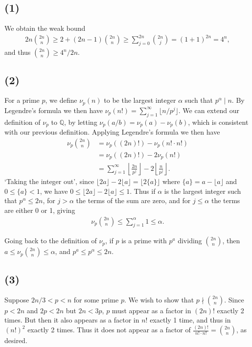 \documentclass[11pt, a4paper, reqno]{amsart}
\theoremstyle{definition}
\begin{document}
\subsection*{(1)}
We obtain the weak bound
\begin{align*}
	2n\binom{2n}{n} \geq 2 + (2n - 1)\binom{2n}{n} \geq \sum_{j = 0}^{2n}\binom{2n}{j} = (1 + 1)^{2n} = 4^{n},
\end{align*}
and thus $\binom{2n}{n} \geq 4^n/2n$.

\subsection*{(2)} For a prime $p$, we define $\nu_p(n)$ to be the largest integer $\alpha$ such that $p^\alpha \mid n$. By Legendre's formula we then have $\nu_p(n!) = \sum_{j = 1}^{\infty}\lfloor n/p^j \rfloor$.
We can extend our definition of $\nu_p$ to $\mathbb{Q}$, by letting $\nu_p(a/b) = \nu_p(a) - \nu_p(b)$, which is consistent with our previous definition. Applying Legendre's formula we then have
\begin{align*}
	\nu_p \binom{2n}{n} &= \nu_p((2n)!) - \nu_p(n! \cdot n!) \\
	&= \nu_p((2n)!) - 2\nu_p(n!) \\
	&= \sum_{j = 1}^{\infty} \left\lfloor \frac{2n}{p^j}\right\rfloor - 2 \left\lfloor \frac{n}{p^j}\right\rfloor.
\end{align*}
`Taking the integer out', since  $\lfloor 2a \rfloor - 2\lfloor a \rfloor = \lfloor 2 \{a\}\rfloor$ where $\{a\} = a - \lfloor a \rfloor$ and $0 \leq \{a\} < 1$, we have $0 \leq \lfloor 2a\rfloor - 2 \lfloor a \rfloor \leq 1$. Thus if $\alpha$ is the largest integer such that $p^{\alpha} \leq 2n$, for $j > \alpha$ the terms of the sum are zero, and for $j \leq \alpha$ the terms are either 0 or 1, giving
\begin{align*}
	\nu_p \binom{2n}{n} \leq \sum_{j = 1}^{\alpha}1 \leq \alpha.
\end{align*}

Going back to the definition of $\nu_p$, if $p$ is a prime with $p^a$ dividing $\binom{2n}{n}$, then $a \leq \nu_p \binom{2n}{n} \leq \alpha$, and $p^a \leq p^{\alpha} \leq 2n$.

\subsection*{(3)} Suppose $2n/3 < p < n$ for some prime $p$. We wish to show that $p \nmid \binom{2n}{n}$. Since $p< 2n$ and $2p < 2n$ but $2n < 3p$, $p$ must appear as a factor in $(2n)!$ exactly 2 times. But then it also appears as a factor in $n!$ exactly 1 time, and thus in $(n!)^2$ exactly 2 times. Thus it does not appear as a factor of $\frac{(2n)!}{n! \cdot n!} = \binom{2n}{n}$, as desired.
\end{document}
